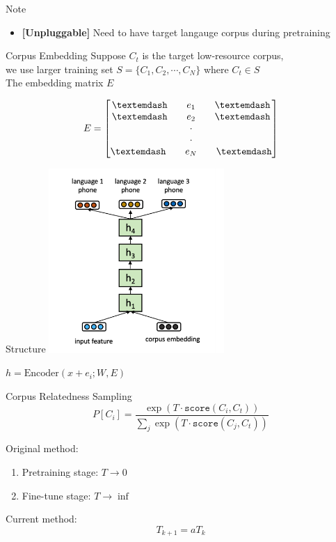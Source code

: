\documentclass{beamer}
\begin{document}
\begin{frame}{Note}
  \begin{itemize}
    \item \textbf{[Unpluggable]} Need to have target langauge corpus during pretraining
  \end{itemize}
\end{frame}

\begin{frame}{Corpus Embedding}
  Suppose $C_t$ is the target low-resource corpus, \\ 
  we use larger training set $S = \lbrace C_1, C_2, \cdots, C_N \rbrace$ where $C_t \in S$ \\
  The embedding matrix $E$


  \[
    E = \begin{bmatrix}
    \textemdash \quad \quad e_1 \quad \quad \textemdash  \\
    \textemdash \quad \quad e_2 \quad \quad \textemdash \\
    \cdot\\
    \cdot\\
    \textemdash \quad \quad e_N \quad \quad \textemdash\\
\end{bmatrix}
  \]

\end{frame}

\begin{frame}{Structure}
  \center \includegraphics[width=0.5\textwidth]{fig/CRS-struct.png}

    $h = \text{Encoder}(x + e_i;W,E)$
\end{frame}

\begin{frame}{Corpus Relatedness Sampling}
  \[
  P [C_i] = \frac{\exp (T \cdot \texttt{score} (C_i, C_t))}{\sum_j \exp (T \cdot \texttt{score} (C_j, C_t))}
\]

Original method:
\begin{enumerate}
  \item Pretraining stage: $T \rightarrow 0$
  \item Fine-tune stage: $T \rightarrow \inf$
\end{enumerate}
Current method:
\[
  T_{k+1} = a T_k
\]
\end{frame}
\end{document}
